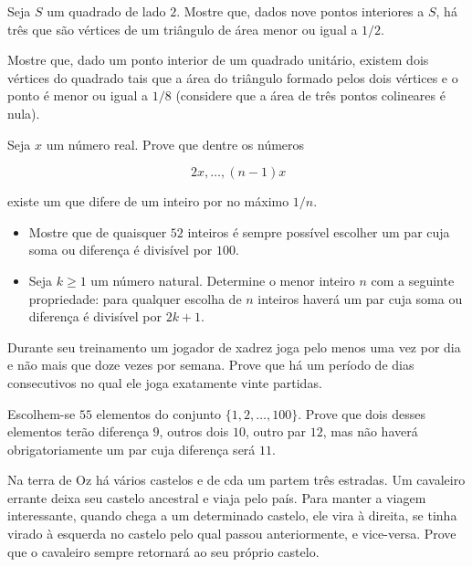 \begin{questao}
  Seja $S$ um quadrado de lado $2$. Mostre que, dados nove pontos interiores a
  $S$, há três que são vértices de um triângulo de área menor ou igual a $1/2$.
\end{questao}

\begin{questao}
  Mostre que, dado um ponto interior de um quadrado unitário, existem dois
  vértices do quadrado tais que a área do triângulo formado pelos dois vértices
  e o ponto é menor ou igual a $1/8$ (considere que a área de três pontos
  colineares é nula).
\end{questao}

\begin{questao}
  Seja $x$ um número real. Prove que dentre os números 

  $$ \, 2x, \ldots, (n-1)x$$

  existe um que difere de um inteiro por no máximo $1/n$.
\end{questao}

\begin{questao}
  \begin{itemize}
    \item Mostre que de quaisquer $52$ inteiros é sempre possível escolher um par
    cuja soma ou diferença é divisível por $100$.

    \item Seja $k \geq 1$ um número natural. Determine o menor inteiro $n$ com a
    seguinte propriedade: para qualquer escolha de $n$ inteiros haverá um par
    cuja soma ou diferença é divisível por $2k+1$.
  \end{itemize}
\end{questao}

\begin{questao}
  Durante seu treinamento um jogador de xadrez joga pelo menos uma vez por dia e
  não mais que doze vezes por semana. Prove que há um período de dias
  consecutivos no qual ele joga exatamente vinte partidas.
\end{questao}

\begin{questao}
  Escolhem-se $55$ elementos do conjunto
  $\{1,2,\ldots,100\}$. Prove que dois desses elementos terão
  diferença $9$, outros dois $10$, outro par $12$, mas não
  haverá obrigatoriamente um par cuja diferença será $11$.
\end{questao}

\begin{questao}
  Na terra de Oz há vários castelos e de cda um partem três
  estradas. Um cavaleiro errante deixa seu castelo ancestral e viaja
  pelo país. Para manter a viagem interessante, quando chega a um
  determinado castelo, ele vira à direita, se tinha virado à esquerda
  no castelo pelo qual passou anteriormente, e vice-versa. Prove que o
  cavaleiro sempre retornará ao seu próprio castelo.
\end{questao}

